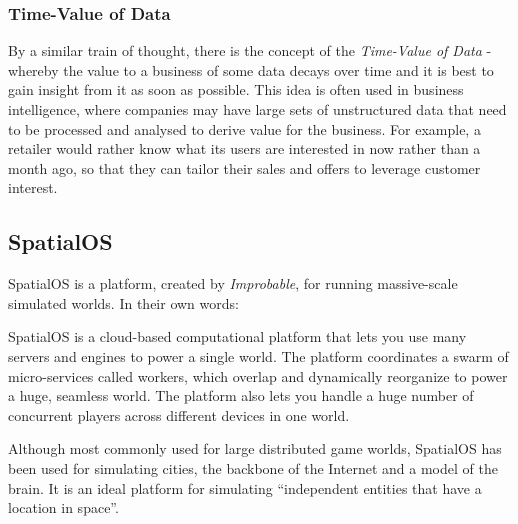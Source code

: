 \documentclass[a4paper,12pt,titlepage]{article}
\begin{document}
\subsubsection{Time-Value of Data}
By a similar train of thought, there is the concept of the \textit{Time-Value of Data} - whereby the value to a business of some data decays over time and it is best to gain insight from it as soon as possible. This idea is often used in business intelligence, where companies may have large sets of unstructured data that need to be processed and analysed to derive value for the business. For example, a retailer would rather know what its users are interested in now rather than a month ago, so that they can tailor their sales and offers to leverage customer interest.

\newpage
\subsection{SpatialOS}
SpatialOS is a platform, created by \textit{Improbable}\cite{ImprobableWorldsLtd.2018a}, for running massive-scale simulated worlds. In their own words\cite{ImprobableWorldsLtd.2018b}:
\begin{displayquote}
SpatialOS is a cloud-based computational platform that lets you use many servers and engines to power a single world. The platform coordinates a swarm of micro-services called workers, which overlap and dynamically reorganize to power a huge, seamless world. The platform also lets you handle a huge number of concurrent players across different devices in one world.
\end{displayquote}

Although most commonly used for large distributed game worlds, SpatialOS has been used for simulating cities\cite{Narula2017}, the backbone of the Internet\cite{ImprobableWorldsLtd.2016} and a model of the brain\cite{ImprobableWorldsLtd.2018}. It is an ideal platform for simulating ``independent entities that have a location in space''\cite{ImprobableWorldsLtd.2018}.
\end{document}
